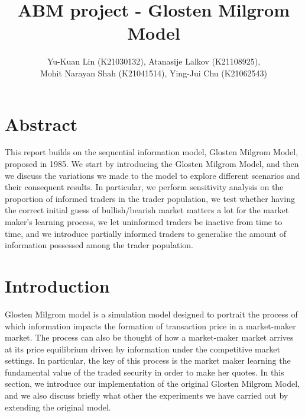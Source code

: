 \documentclass{article}
\title{ABM project - Glosten Milgrom Model}
\author{Yu-Kuan Lin (K21030132), Atanasije Lalkov (K21108925),\\
Mohit Narayan Shah (K21041514), Ying-Jui Chu (K21062543)}
\date{}  %
\begin{document}
\maketitle

\graphicspath{ {./images/} }

\section{Abstract}
This report builds on the sequential information model, Glosten Milgrom Model, proposed in 1985\cite{gm:1985}. We start by introducing the Glosten Milgrom Model, and then we discuss the variations we made to the model to explore different scenarios and their consequent results. In particular, we perform sensitivity analysis on the proportion of informed traders in the trader population, we test whether having the correct initial guess of bullish/bearish market matters a lot for the market maker's learning process, we let uninformed traders be inactive from time to time, and we introduce partially informed traders to generalise the amount of information possessed among the trader population.

\section{Introduction}
Glosten Milgrom model is a simulation model designed to portrait the process of which information impacts the formation of transaction price in a market-maker market. The process can also be thought of how a market-maker market arrives at its price equilibrium driven by information under the competitive market settings. In particular, the key of this process is the market maker learning the fundamental value of the traded security in order to make her quotes. In this section, we introduce our implementation of the original Glosten Milgrom Model, and we also discuss briefly what other the experiments we have carried out by extending the original model.
\end{document}
